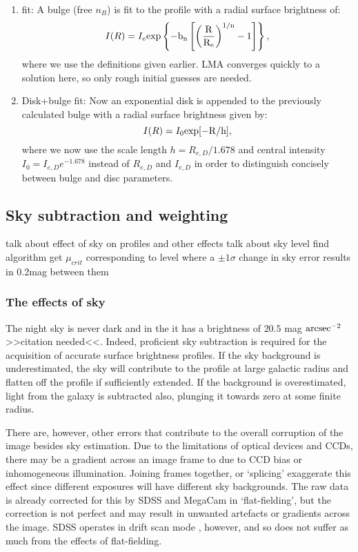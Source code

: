 \begin{enumerate}
	\item \sersic fit: A \sersic bulge (free $n_B$) is fit to the profile with a radial surface brightness of:
	\begin{equation}
		I(R) = I_{e} \rm{exp}\left\{-b_{n}\left[\left(\frac{R}{R_{e}}\right)^{1/n} - 1\right]\right\},
	\end{equation}
	where we use the definitions given earlier.	LMA converges quickly to a solution here, so only rough initial guesses are needed.

	\item Disk+bulge fit: Now an exponential disk is appended to the previously calculated bulge with a radial surface brightness given by:
	\begin{equation}
		I(R) = I_0 \rm{exp}[-R/h],
	\end{equation}
	where we now use the scale length $h=R_{e,D}/1.678$ and central intensity $I_0=I_{e,D}e^{-1.678}$ instead of $R_{e,D}$ and $I_{e,D}$ in order to distinguish concisely between bulge and disc parameters. 
\end{enumerate}

\subsection{Sky subtraction and weighting}
talk about effect of sky on profiles and other effects
talk about sky level find algorithm
get $\mu_{crit}$ corresponding to level where a $\pm1\sigma$ change in sky error results in 0.2mag between them


\subsubsection{The effects of sky}
The night sky is never dark and in the \iband it has a brightness of $20.5$ mag $\rm{arcsec}^{-2}$ >>citation needed<<. Indeed, proficient sky subtraction is required for the acquisition of accurate surface brightness profiles. If the sky background is underestimated, the sky will contribute to the profile at large galactic radius and flatten off the profile if sufficiently extended. If the background is overestimated, light from the galaxy is subtracted also, plunging it towards zero at some finite radius. 
\begin{figure}
	\label{fig: effects of sky from binney}
\end{figure}
There are, however, other errors that contribute to the overall corruption of the image besides sky estimation. Due to the limitations of optical devices and CCDs, there may be a gradient across an image frame to due to CCD bias or inhomogeneous illumination. Joining frames together, or `splicing' exaggerate this effect since different exposures will have different sky backgrounds. The raw data is already corrected for this by SDSS and MegaCam in `flat-fielding', but the correction is not perfect and may result in unwanted artefacts or gradients across the image. SDSS operates in drift scan mode \citep{abazajian_seventh_2009}, however, and so does not suffer as much from the effects of flat-fielding.

